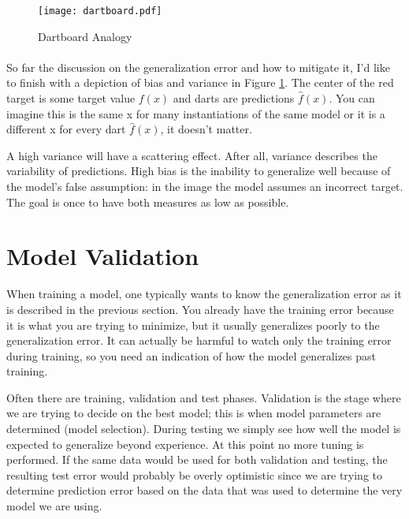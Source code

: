 \begin{figure}
\center
\texttt{[image: dartboard.pdf]}
\caption[Dartboard Analogy]{
  Dartboard Analogy
  \parencite{sammut2011encyclopedia}
}
\label{fig:bullseye}
\end{figure}

\paragraph{}
So far the discussion on the
generalization error and how to mitigate it,
I'd like to finish with a depiction
of bias and variance in Figure \ref{fig:bullseye}.
The center of the red target
is some target value $f(x)$
and darts are predictions $\hat{f}(x)$.
You can imagine this is the same x
for many instantiations of the same model
or it is a different x for every dart $\hat{f}(x)$,
it doesn't matter.

A high variance will have a scattering effect.
After all,
variance describes the variability of predictions.
High bias is the inability to generalize
well because of the model's false assumption:
in the image the model assumes an incorrect target.
The goal is once to have both measures as low as possible.

\section{Model Validation}
When training a model,
one typically wants to know the generalization error
as it is described in the previous section.
You already have the training error
because it is what you are trying to minimize,
but it usually generalizes poorly
to the generalization error.
It can actually be harmful to
watch only the training error during training,
so you need an indication of how the model
generalizes past training.

Often there are training, validation and test phases.
Validation is the stage
where we are trying to decide on the best model;
this is when model parameters are determined
(model selection).
During testing we simply see how well the model
is expected to generalize beyond experience.
At this point no more tuning is performed.
If the same data would be used for both validation
and testing,
the resulting test error
would probably be overly optimistic
\parencite{friedman2001elements}
since we are trying to determine prediction error
based on the data that was used to determine
the very model we are using.


